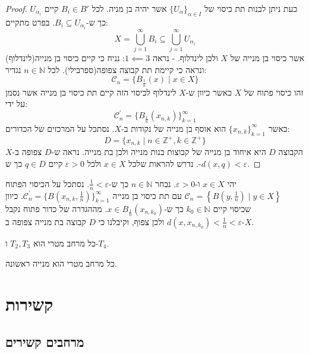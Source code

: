 \documentclass{tstextbook}
\begin{document}
\begin{proof}
כעת ניתן לבנות תת כיסוי של \(\{ U_{\alpha} \}_{\alpha \in I}\) אשר יהיה בן מניה. לכל \(B_{i}\in B'\) קיים \(U_{\alpha_{i}}\) כך ש-\(B_{i}\subseteq U_{\alpha_{i}}\). בפרט מתקיים:
$$X=\bigcup_{j=1}^{\infty}B_{i}\subseteq\bigcup_{j=1}^{\infty}U_{\alpha_{i}}$$
 אשר כיסוי בן מנייה של \(X\) ולכן לינדלוף.
 - נראה \(1\impliedby 3\): נניח כי קיים כיסוי בן מנייה(לינדלוף) ונראה כי קיימת תת קבוצה צפופה(ספרבילי). לכל \(n \in \mathbb{N}\) נגדיר:
$${\mathcal{C}}_{n}=\{B_{{\frac{1}{n}}}(x)\mid x\in X\}$$
זהו כיסוי פתוח של \(X\) כאשר כיוון ש-\(X\) לינדלוף לכיסוי הזה קיים תת כיסוי בן מנייה אשר נסמן על ידי:
$${\mathcal{C}}_{n}^{\prime}=\{B_{{\frac{1}{n}}}(x_{n,k})\}_{k=1}^{\infty}$$
כאשר \(\{ x_{n,k} \}_{k=1}^{\infty}\) הוא אוסף בן מנייה של נקודות ב-\(X\). נסתכל על המרכזים של הכדורים:
$$D=\{x_{n,k}\mid n\in\mathbb{Z}^{+},k\in\mathbb{Z}^{+}\}$$
הקבוצה \(D\) היא איחוד בן מנייה של קבוצות בנות מנייה ולכן בת מנייה. נראה ש-\(D\) צפופה ב-\(X\). נדרש להראות שלכל \(x \in X\) ולכל \(\varepsilon> 0\) קיים \(q \in D\) כך ש-\(d(x,q)< \varepsilon\). 

\end{proof}
יהי \(x \in X\) ו-\(\varepsilon>0\). נבחר \(n \in \mathbb{N}\) כך ש-\(\frac{1}{n}<\varepsilon\). נסתכל על הכיסוי הפתוח \({\mathcal{C}}_{n}=\left\{B(y,{\textstyle{\frac{1}{n}}})\mid y\in X\right\}\) עם תת כיסוי בן מנייה \({\mathcal{C}}_{n}^{\prime}=\{B(x_{n,k},{\frac{1}{n}})\}_{k=1}^{\infty}\). כיוון שכיסוי קיים \(k_{0} \in \mathbb{N}\) כך ש-\(x \in B_{\frac{1}{n}}(x_{n,k_{0}})\). מההגדרה של כדור פתוח נקבל \(d(x,x_{n,k_{0}})<\frac{1}{n}<\varepsilon\) ולכן צפוף, וקיבלנו כי \(D\) קבוצה בת מנייה צפופה ב-\(X\).

\begin{proposition}
כל מרחב מטרי הוא \(T_{2},T_{3}\) ו-\(T_{4}\).

\end{proposition}
\begin{proposition}
כל מרחב מטרי הוא מנייה ראשונה.

\end{proposition}
\chapter{קשירות}

\section{מרחבים קשירים}
\end{document}
